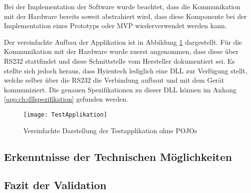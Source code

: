 Bei der Implementation der Software wurde beachtet, dass die Kommunikation mit der Hardware bereits soweit abstrahiert wird, dass diese Komponente bei der Implementation eines Prototyps oder MVP wiederverwendet werden kann.

Der vereinfachte Aufbau der Applikation ist in Abbildung \ref{fig:test_applikation_aufbau} dargestellt. Für die Kommunikation mit der Hardware wurde zuerst angenommen, dass diese über RS232 stattfindet und diese Schnittstelle vom Hersteller dokumentiert sei. Es stellte sich jedoch heraus, dass Hyientech lediglich eine DLL zur Verfügung stellt, welche selber über die RS232 die Verbindung aufbaut und mit dem Gerät kommuniziert. Die genauen Spezifikationen zu dieser DLL können im Anhang \ref{app:ch:dllspezifikation} gefunden werden.

\begin{figure}[h!]
	\centering
	\texttt{[image: TestApplikation]}
	\caption{Vereinfachte Darstellung der Testapplikation ohne POJOs}
	\label{fig:test_applikation_aufbau}
\end{figure}
 
\subsection{Erkenntnisse der Technischen Möglichkeiten}

\subsection{Fazit der Validation}